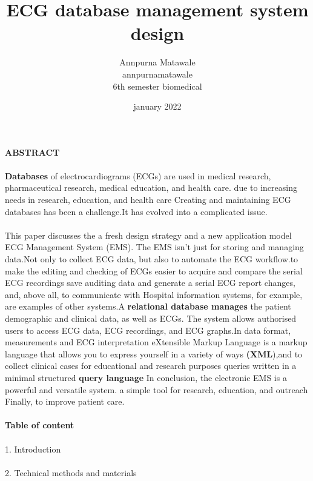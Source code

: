 \documentclass[12pt]{article}
\title{\textbf{ECG database management system design}}
\author{Annpurna Matawale\\annpurnamatawale\\6th semester biomedical}
\date {  january 2022}
\begin{document}
\maketitle
\textbf{ABSTRACT}
\paragraph{}
\textbf{Databases} of electrocardiograms (ECGs) are used in medical research, pharmaceutical research, medical education, and health care. due to increasing needs in research, education, and health care Creating and maintaining ECG databases has been a challenge.It has evolved into a complicated issue.\paragraph{} This paper discusses the a fresh design strategy and a new application model
ECG Management System  (EMS). The  EMS isn't just for storing and managing data.Not only to collect ECG data, but also to automate the ECG workflow.to make the editing and checking of ECGs easier to acquire and compare the serial ECG recordings
save auditing data and generate a serial ECG report changes, and, above all, to communicate with Hospital information systems, for example, are examples of other systems.A \textbf{relational database manages }the patient demographic and clinical data, as well as ECGs. The system allows authorised users to access ECG data, ECG recordings, and ECG graphs.In data format, measurements and ECG interpretation eXtensible Markup Language is a markup language that allows you to express yourself in a variety of ways \textbf{(XML}),and to collect clinical cases for educational and research purposes queries written in a minimal structured \textbf{query language} In conclusion, the electronic  EMS is a powerful and versatile system.
a simple tool for research, education, and outreach
Finally, to improve patient care.

\paragraph{\textbf{Table of content}}
\paragraph{}1. Introduction \paragraph{} 2. Technical methods and materials
\end{document}
